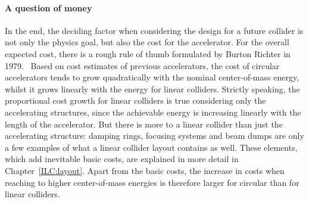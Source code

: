 \paragraph{A question of money}
In the end, the deciding factor when considering the design for a future collider is not only the physics goal, but also the cost for the accelerator.
For the overall expected cost, there is a rough rule of thumb formulated by Burton Richter in 1979.~\cite[p. 87ff]{Richter}
Based on cost estimates of previous accelerators, the cost of circular accelerators tends to grow quadratically with the nominal center-of-mass energy, whilst it grows linearly with the energy for linear colliders.
Strictly speaking, the proportional cost growth for linear colliders is true considering only the accelerating structures, since the achievable energy is increasing linearly with the length of the accelerator.
But there is more to a linear collider than just the accelerating structure: damping rings, focusing systems and beam dumps are only a few examples of what a linear collider layout contains as well.
These elements, which add inevitable basic costs, are explained in more detail in Chapter~\ref{ILC:layout}.
Apart from the basic costs, the increase in costs when reaching to higher center-of-mass energies is therefore larger for circular than for linear colliders.

